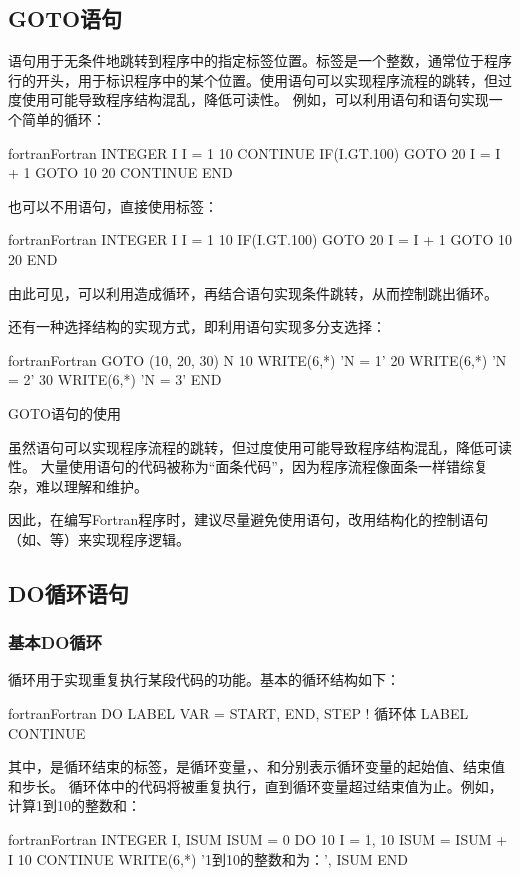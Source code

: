 \subsection{GOTO语句}
语句用于无条件地跳转到程序中的指定标签位置。标签是一个整数，通常位于程序行的开头，用于标识程序中的某个位置。使用语句可以实现程序流程的跳转，但过度使用可能导致程序结构混乱，降低可读性。
例如，可以利用语句和语句实现一个简单的循环：
\begin{envcode}{fortran}{Fortran}
      INTEGER I
      I = 1
10    CONTINUE
      IF(I.GT.100) GOTO 20
      I = I + 1
      GOTO 10
20    CONTINUE
      END
\end{envcode}

也可以不用语句，直接使用标签：
\begin{envcode}{fortran}{Fortran}
      INTEGER I
      I = 1
10    IF(I.GT.100) GOTO 20
      I = I + 1
      GOTO 10
20    END
\end{envcode}

由此可见，可以利用造成循环，再结合语句实现条件跳转，从而控制跳出循环。

还有一种选择结构的实现方式，即利用语句实现多分支选择：
\begin{envcode}{fortran}{Fortran}
      GOTO (10, 20, 30) N
10    WRITE(6,*) 'N = 1'
20    WRITE(6,*) 'N = 2'
30    WRITE(6,*) 'N = 3'
      END
\end{envcode}

\begin{zy}
GOTO语句的使用

虽然语句可以实现程序流程的跳转，但过度使用可能导致程序结构混乱，降低可读性。
大量使用语句的代码被称为“面条代码”，因为程序流程像面条一样错综复杂，难以理解和维护。

因此，在编写Fortran程序时，建议尽量避免使用语句，改用结构化的控制语句（如、等）来实现程序逻辑。
\end{zy}

\subsection{DO循环语句}
\subsubsection{基本DO循环}
循环用于实现重复执行某段代码的功能。基本的循环结构如下：
\begin{envcode}{fortran}{Fortran}
      DO LABEL VAR = START, END, STEP
          ! 循环体
LABEL CONTINUE
\end{envcode}
其中，是循环结束的标签，是循环变量，、和分别表示循环变量的起始值、结束值和步长。
循环体中的代码将被重复执行，直到循环变量超过结束值为止。例如，计算1到10的整数和：
\begin{envcode}{fortran}{Fortran}
      INTEGER I, ISUM
      ISUM = 0
      DO 10 I = 1, 10
          ISUM = ISUM + I
10    CONTINUE
      WRITE(6,*) '1到10的整数和为：', ISUM
      END
\end{envcode}

